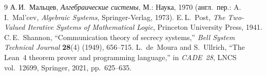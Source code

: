 \documentclass[11pt,a4paper]{article}
\theoremstyle{plain}
\theoremstyle{definition}
\begin{document}
\begin{thebibliography}{9}
А.\,И.~Мальцев, \emph{Алгебраические системы}, М.: Наука, 1970 (англ.\ пер.: A.\,I.~Mal'cev, \emph{Algebraic Systems}, Springer-Verlag, 1973).
E.\,L.~Post, \emph{The Two-Valued Iterative Systems of Mathematical Logic}, Princeton University Press, 1941.
C.\,E.~Shannon, ``Communication theory of secrecy systems,'' \emph{Bell System Technical Journal} \textbf{28}(4) (1949), 656--715.
L.~de~Moura and S.~Ullrich, ``The Lean~4 theorem prover and programming language,'' in \emph{CADE~28}, LNCS vol.~12699, Springer, 2021, pp.~625--635.
\end{thebibliography}
\end{document}
